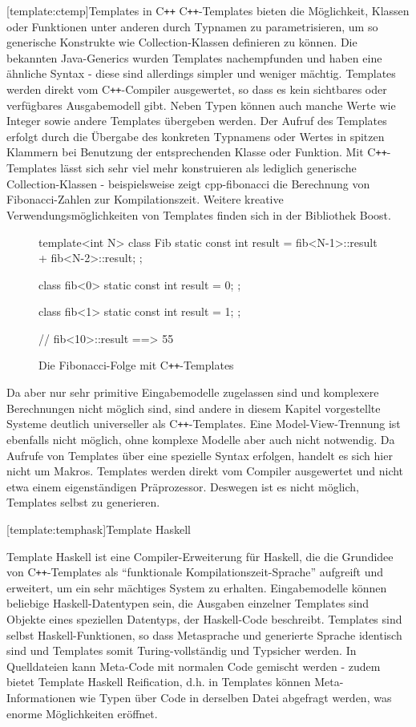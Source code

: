 \documentclass[11pt, a4paper, bibgerm]{scrbook}
\newcommand\lsection{}
\newcommand\abb{}
\newcommand{\cpp}{C\texttt{++}}
\begin{document}
\lsection[template:ctemp]{Templates in \cpp{}} \cpp{}-Templates
bieten die Möglichkeit, Klassen oder Funktionen unter anderen durch
Typnamen zu parametrisieren, um so generische Konstrukte wie
Collection-Klassen definieren zu können. Die bekannten Java-Generics
\cite{JavaGenerics} wurden Templates nachempfunden und haben eine ähnliche
Syntax - diese sind allerdings simpler und weniger mächtig. Templates
werden direkt vom \cpp{}-Compiler ausgewertet, so dass es kein
sichtbares oder verfügbares Ausgabemodell gibt. Neben Typen können auch
manche Werte wie Integer sowie andere Templates übergeben werden. Der
Aufruf des Templates erfolgt durch die Übergabe des konkreten Typnamens
oder Wertes in spitzen Klammern bei Benutzung der entsprechenden Klasse
oder Funktion. Mit \cpp{}-Templates lässt sich sehr viel mehr
konstruieren als lediglich generische Collection-Klassen -
beispielsweise zeigt \abb{cpp-fibonacci} die Berechnung von
Fibonacci-Zahlen zur Kompilationszeit. Weitere kreative
Verwendungsmöglichkeiten von Templates finden sich in der Bibliothek
Boost\cite{Boost}.
\begin{figure}
  \centering
  \begin{code}
template<int N> class Fib {
  static const int result = fib<N-1>::result + fib<N-2>::result;
};

class fib<0> {
  static const int result = 0;
};

class fib<1> {
  static const int result = 1;
};

// fib<10>::result  ==> 55
  \end{code}
  \caption{Die Fibonacci-Folge mit \cpp{}-Templates}
  \label{magicl:fig:cpp-fibonacci}
\end{figure}
Da aber nur sehr primitive Eingabemodelle zugelassen sind und komplexere
Berechnungen nicht möglich sind, sind andere in diesem Kapitel
vorgestellte Systeme deutlich universeller als \cpp{}-Templates. Eine
Model-View-Trennung ist ebenfalls nicht möglich, ohne komplexe Modelle
aber auch nicht notwendig. Da Aufrufe von Templates über eine spezielle
Syntax erfolgen, handelt es sich hier nicht um Makros. Templates werden
direkt vom Compiler ausgewertet und nicht etwa einem eigenständigen
Präprozessor. Deswegen ist es nicht möglich, Templates selbst zu
generieren.

\lsection[template:temphask]{Template Haskell}

Template Haskell ist eine Compiler-Erweiterung für Haskell, die die
Grundidee von \cpp{}-Templates als "`funktionale
Kompilationszeit-Sprache"' aufgreift und erweitert, um ein sehr
mächtiges System zu erhalten. Eingabemodelle können beliebige
Haskell-Datentypen sein, die Ausgaben einzelner Templates sind Objekte
eines speziellen Datentyps, der Haskell-Code beschreibt. Templates sind
selbst Haskell-Funktionen, so dass Metasprache und generierte Sprache
identisch sind und Templates somit Turing-vollständig und Typsicher
werden. In Quelldateien kann Meta-Code mit normalen Code gemischt werden
- zudem bietet Template Haskell Reification, d.h. in Templates können
Meta-Informationen wie Typen über Code in derselben Datei abgefragt
werden, was enorme Möglichkeiten eröffnet.
\end{document}

